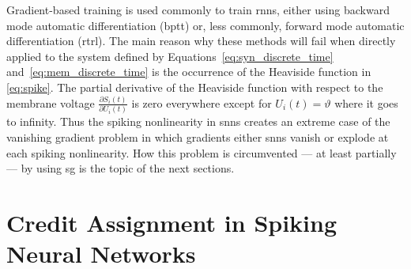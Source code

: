 \documentclass[journal,onecolumn,11pt]{IEEEtran}
\begin{document}
Gradient-based training is used commonly to train \glspl{rnn}, either using
backward mode automatic differentiation (\gls{bptt}) or, less commonly, forward
mode automatic differentiation (\gls{rtrl}).  The main reason why these methods
will fail when directly applied to the system defined by
Equations~\eqref{eq:syn_discrete_time} and~\eqref{eq:mem_discrete_time} is the
occurrence of the Heaviside function in \eqref{eq:spike}.  The partial
derivative of the Heaviside function with respect to the membrane voltage
$\frac{\partial S_i(t)}{\partial U_i(t)}$ is zero everywhere except for
$U_i(t)=\vartheta$ where it goes to infinity.  Thus the spiking nonlinearity in
\glspl{snn} creates an extreme case of the vanishing gradient problem in which
gradients either \glspl{snn} vanish or explode at each spiking nonlinearity.
How this problem is circumvented --- at least partially --- by using \gls{sg} is
the topic of the next sections.


\section{Credit Assignment in Spiking Neural Networks}
\label{sec:credit_assignment}

\end{document}

